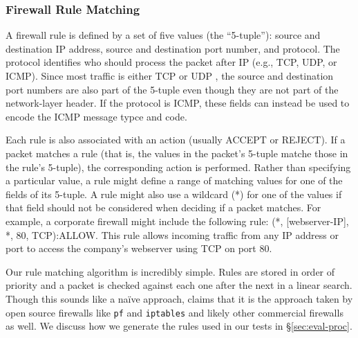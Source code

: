 \subsubsection{Firewall Rule Matching}

A firewall rule is defined by a set of five values (the ``5-tuple''): source
and destination IP address, source and destination port number, and protocol.
The protocol identifies who should process the packet after IP (e.g., TCP, UDP,
or ICMP). Since most traffic is either TCP or UDP , the source and
destination port numbers are also part of the 5-tuple even though they are not
part of the network-layer header. If the protocol is ICMP, these fields can
instead be used to encode the ICMP message typce and code.

Each rule is also associated with an action (usually ACCEPT or REJECT). If a
packet matches a rule (that is, the values in the packet's 5-tuple matche those
in the rule's 5-tuple), the corresponding action is performed. Rather than
specifying a particular value, a rule might define a range of matching values
for one of the fields of its 5-tuple. A rule might also use a wildcard (*) for
one of the values if that field should not be considered when deciding if a
packet matches. For example, a corporate firewall might include the following
rule: (*, [webserver-IP], *, 80, TCP):ALLOW. This rule allows incoming traffic
from any IP address or port to access the company's webserver using TCP on port
80.

Our rule matching algorithm is incredibly simple. Rules are stored in order of
priority and a packet is checked against each one after the next in a linear
search. Though this sounds like a na\"{i}ve approach, \cite{Rovniagin} claims
that it is the approach taken by open source firewalls like \texttt{pf} and
\texttt{iptables} and likely other commercial firewalls as well. We discuss how
we generate the rules used in our tests in \S\ref{sec:eval-proc}.
